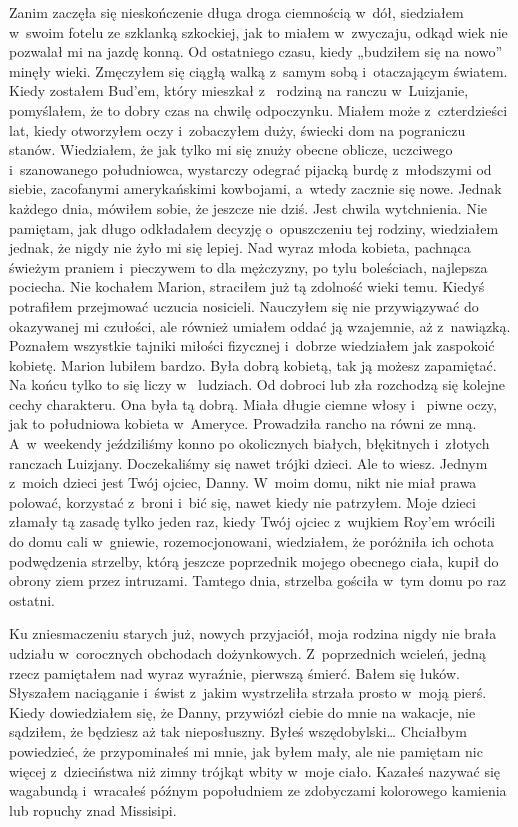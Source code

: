 Zanim zaczęła się nieskończenie długa droga ciemnością w~dół, siedziałem w~swoim fotelu ze szklanką szkockiej, jak to 
miałem w~zwyczaju, odkąd wiek nie pozwalał mi na jazdę konną. Od ostatniego czasu, kiedy „budziłem się na nowo” 
minęły wieki. Zmęczyłem się ciągłą walką z~samym sobą i~otaczającym światem. Kiedy zostałem Bud’em, który mieszkał z~
rodziną na ranczu w~Luizjanie, pomyślałem, że to dobry czas na chwilę odpoczynku. Miałem może z~czterdzieści lat, 
kiedy otworzyłem oczy i~zobaczyłem duży, świecki dom na pograniczu stanów. Wiedziałem, że jak tylko mi się znuży 
obecne oblicze, uczciwego i~szanowanego południowca, wystarczy odegrać pijacką burdę z~młodszymi od siebie, 
zacofanymi amerykańskimi kowbojami, a~wtedy zacznie się nowe. Jednak każdego dnia, mówiłem sobie, że jeszcze nie 
dziś. Jest chwila wytchnienia. Nie pamiętam, jak długo odkładałem decyzję o~opuszczeniu tej rodziny, wiedziałem 
jednak, że nigdy nie żyło mi się lepiej. Nad wyraz młoda kobieta, pachnąca świeżym praniem i~pieczywem to dla 
mężczyzny, po tylu boleściach, najlepsza pociecha. Nie kochałem Marion, straciłem już tą zdolność wieki temu. Kiedyś 
potrafiłem przejmować uczucia nosicieli. Nauczyłem się nie przywiązywać do okazywanej mi czułości, ale również 
umiałem oddać ją wzajemnie, aż z~nawiązką. Poznałem wszystkie tajniki miłości fizycznej i~dobrze wiedziałem jak 
zaspokoić kobietę. Marion lubiłem bardzo. Była dobrą kobietą, tak ją możesz zapamiętać. Na końcu tylko to się liczy w~
ludziach. Od dobroci lub zła rozchodzą się kolejne cechy charakteru. Ona była tą dobrą. Miała długie ciemne włosy i~
piwne oczy, jak to południowa kobieta w~Ameryce. Prowadziła rancho na równi ze mną. A~w~weekendy jeździliśmy konno po 
okolicznych białych, błękitnych i~złotych ranczach Luizjany. Doczekaliśmy się nawet trójki dzieci. Ale to wiesz. 
Jednym z~moich dzieci jest Twój ojciec, Danny. W~moim domu, nikt nie miał prawa polować, korzystać z~broni i~bić się, 
nawet kiedy nie patrzyłem. Moje dzieci złamały tą zasadę tylko jeden raz, kiedy Twój ojciec z~wujkiem Roy’em wrócili 
do domu cali w~gniewie, rozemocjonowani, wiedziałem, że poróżniła ich ochota podwędzenia strzelby, którą jeszcze 
poprzednik mojego obecnego ciała, kupił do obrony ziem przez intruzami. Tamtego dnia, strzelba gościła w~tym domu po 
raz ostatni.

Ku zniesmaczeniu starych już, nowych przyjaciół, moja rodzina nigdy nie brała udziału w~corocznych obchodach 
dożynkowych. Z~poprzednich wcieleń, jedną rzecz pamiętałem nad wyraz wyraźnie, pierwszą śmierć. Bałem się łuków. 
Słyszałem naciąganie i~świst z~jakim wystrzeliła strzała prosto w~moją pierś. Kiedy dowiedziałem się, że Danny, 
przywiózł ciebie do mnie na wakacje, nie sądziłem, że będziesz aż tak nieposłuszny. Byłeś wszędobylski… Chciałbym 
powiedzieć, że przypominałeś mi mnie, jak byłem mały, ale nie pamiętam nic więcej z~dzieciństwa niż zimny trójkąt 
wbity w~moje ciało. Kazałeś nazywać się wagabundą i~wracałeś późnym popołudniem ze zdobyczami kolorowego kamienia lub 
ropuchy znad Missisipi.


